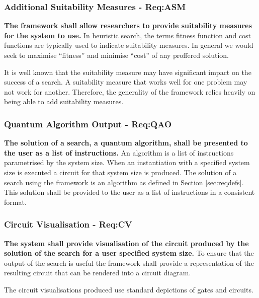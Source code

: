 \subsubsection{Additional Suitability Measures - Req:ASM}
\label{sec:reqasm}
\textbf{The framework shall allow researchers to provide suitability measures for the system to use.}
In heuristic search, the terms fitness function and cost functions are typically used to indicate suitability measures.
In general we would seek to maximise ``fitness'' and minimise ``cost'' of any proffered solution.

It is well known that the suitability measure may have significant impact on the success of a search.
A suitability measure that works well for one problem may not work for another. 
Therefore, the generality of the framework relies heavily on being able to add suitability measures.

\subsubsection{Quantum Algorithm Output - Req:QAO}
\label{sec:reqqao}
\textbf{The solution of a search, a quantum algorithm, shall be presented to the user as a list of instructions.}
An algorithm is a list of instructions parametrised by the system size.
When an instantiation with a specified system size is executed a circuit for that system size is produced.
The solution of a search using the framework is an algorithm as defined in Section \ref{sec:reqdefs}.
This solution shall be provided to the user as a list of instructions in a consistent format.

\subsubsection{Circuit Visualisation  - Req:CV}
\label{sec:reqcv}
\textbf{The system shall provide visualisation of the circuit produced by the solution of the search for a user specified system size.}
To ensure that the output of the search is useful the framework shall provide a representation of the resulting circuit that can be rendered into a circuit diagram.

The circuit visualisations produced use standard depictions of gates and circuits.

